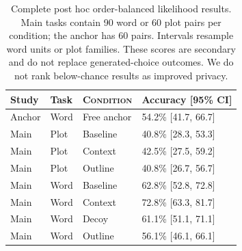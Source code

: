 \begin{table}[htbp]
\centering\small
\begin{tabular}{@{}llll@{}}
\toprule
Study & Task & \textsc{Condition} & Accuracy [95\% CI] \\
\midrule
Anchor & Word & Free anchor & 54.2\% [41.7, 66.7] \\
Main & Plot & Baseline & 40.8\% [28.3, 53.3] \\
Main & Plot & Context & 42.5\% [27.5, 59.2] \\
Main & Plot & Outline & 40.8\% [26.7, 56.7] \\
Main & Word & Baseline & 62.8\% [52.8, 72.8] \\
Main & Word & Context & 72.8\% [63.3, 81.7] \\
Main & Word & Decoy & 61.1\% [51.1, 71.1] \\
Main & Word & Outline & 56.1\% [46.1, 66.1] \\
\bottomrule
\end{tabular}
\caption{Complete post hoc order-balanced likelihood results. Main tasks contain 90 word or 60 plot pairs per condition; the anchor has 60 pairs. Intervals resample word units or plot families. These scores are secondary and do not replace generated-choice outcomes. We do not rank below-chance results as improved privacy.}
\label{tab:likelihood}
\end{table}
